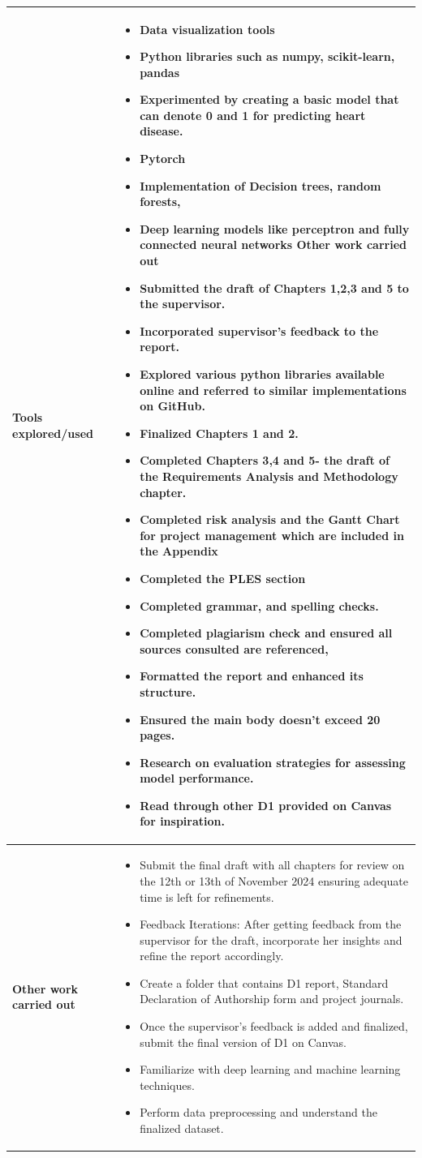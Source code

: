 \begin{longtable}{|p{4cm}|p{11cm}|}
\hline
\textbf{Tools explored/used} & 
\begin{itemize}
\item Data visualization tools 
\item Python libraries such as numpy, scikit-learn, pandas
\item Experimented by creating a basic model that can denote 0 and 1 for predicting heart disease.
\item Pytorch
\item Implementation of Decision trees, random forests, 
\item Deep learning models like perceptron and fully connected neural networks 
Other work carried out	
\item Submitted the draft of Chapters 1,2,3 and 5 to the supervisor.
\item Incorporated supervisor’s feedback to the report. 
\item Explored various python libraries available online and referred to similar implementations on GitHub. 
\item Finalized Chapters 1 and 2.
\item Completed Chapters 3,4 and 5- the draft of the Requirements Analysis and Methodology chapter.
\item Completed risk analysis and the Gantt Chart for project management which are included in the Appendix
\item Completed the PLES section
\item Completed grammar, and spelling checks.
\item Completed plagiarism check and ensured all sources consulted are referenced, 
\item Formatted the report and enhanced its structure.
\item Ensured the main body doesn’t exceed 20 pages.
\item Research on evaluation strategies for assessing model performance.
\item Read through other D1 provided on Canvas for inspiration.

\end{itemize} \\
\hline
\textbf{Other work carried out} &
\begin{itemize}
\item Submit the final draft with all chapters for review on the 12th or 13th of November 2024 ensuring adequate time is left for refinements.
\item Feedback Iterations: After getting feedback from the supervisor for the draft, incorporate her insights and refine the report accordingly. 
\item Create a folder that contains D1 report, Standard Declaration of Authorship form and project journals.
\item Once the supervisor’s feedback is added and finalized, submit the final version of D1 on Canvas.  
\item Familiarize with deep learning and machine learning techniques.
\item Perform data preprocessing and understand the finalized dataset. 



\end{itemize}
\end{longtable}
